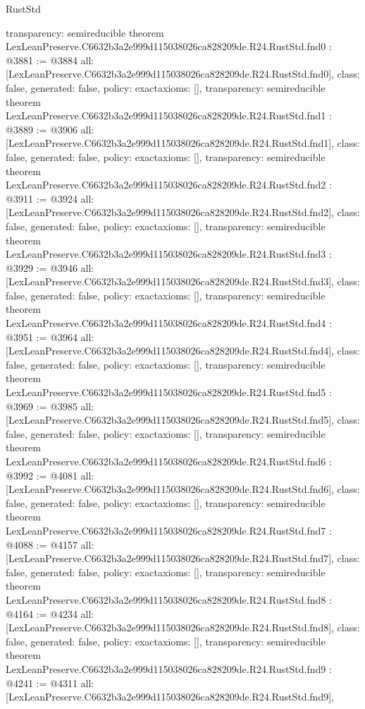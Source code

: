 \begin{lexlean}{RustStd}
\begin{coremodule}
{  transparency: semireducible
}
theorem LexLeanPreserve.C6632b3a2e999d115038026ca828209de.R24.RustStd.fnd0 : @3881 := @3884 {
  all: [LexLeanPreserve.C6632b3a2e999d115038026ca828209de.R24.RustStd.fnd0],
  class: false,
  generated: false,
  policy: exact{axioms: []},
  transparency: semireducible
}
theorem LexLeanPreserve.C6632b3a2e999d115038026ca828209de.R24.RustStd.fnd1 : @3889 := @3906 {
  all: [LexLeanPreserve.C6632b3a2e999d115038026ca828209de.R24.RustStd.fnd1],
  class: false,
  generated: false,
  policy: exact{axioms: []},
  transparency: semireducible
}
theorem LexLeanPreserve.C6632b3a2e999d115038026ca828209de.R24.RustStd.fnd2 : @3911 := @3924 {
  all: [LexLeanPreserve.C6632b3a2e999d115038026ca828209de.R24.RustStd.fnd2],
  class: false,
  generated: false,
  policy: exact{axioms: []},
  transparency: semireducible
}
theorem LexLeanPreserve.C6632b3a2e999d115038026ca828209de.R24.RustStd.fnd3 : @3929 := @3946 {
  all: [LexLeanPreserve.C6632b3a2e999d115038026ca828209de.R24.RustStd.fnd3],
  class: false,
  generated: false,
  policy: exact{axioms: []},
  transparency: semireducible
}
theorem LexLeanPreserve.C6632b3a2e999d115038026ca828209de.R24.RustStd.fnd4 : @3951 := @3964 {
  all: [LexLeanPreserve.C6632b3a2e999d115038026ca828209de.R24.RustStd.fnd4],
  class: false,
  generated: false,
  policy: exact{axioms: []},
  transparency: semireducible
}
theorem LexLeanPreserve.C6632b3a2e999d115038026ca828209de.R24.RustStd.fnd5 : @3969 := @3985 {
  all: [LexLeanPreserve.C6632b3a2e999d115038026ca828209de.R24.RustStd.fnd5],
  class: false,
  generated: false,
  policy: exact{axioms: []},
  transparency: semireducible
}
theorem LexLeanPreserve.C6632b3a2e999d115038026ca828209de.R24.RustStd.fnd6 : @3992 := @4081 {
  all: [LexLeanPreserve.C6632b3a2e999d115038026ca828209de.R24.RustStd.fnd6],
  class: false,
  generated: false,
  policy: exact{axioms: []},
  transparency: semireducible
}
theorem LexLeanPreserve.C6632b3a2e999d115038026ca828209de.R24.RustStd.fnd7 : @4088 := @4157 {
  all: [LexLeanPreserve.C6632b3a2e999d115038026ca828209de.R24.RustStd.fnd7],
  class: false,
  generated: false,
  policy: exact{axioms: []},
  transparency: semireducible
}
theorem LexLeanPreserve.C6632b3a2e999d115038026ca828209de.R24.RustStd.fnd8 : @4164 := @4234 {
  all: [LexLeanPreserve.C6632b3a2e999d115038026ca828209de.R24.RustStd.fnd8],
  class: false,
  generated: false,
  policy: exact{axioms: []},
  transparency: semireducible
}
theorem LexLeanPreserve.C6632b3a2e999d115038026ca828209de.R24.RustStd.fnd9 : @4241 := @4311 {
  all: [LexLeanPreserve.C6632b3a2e999d115038026ca828209de.R24.RustStd.fnd9],
}
\end{coremodule}
\end{lexlean}
